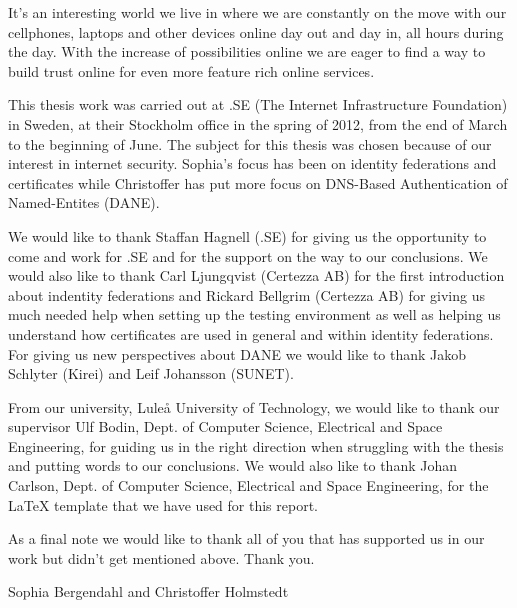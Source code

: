 It's an interesting world we live in where we are constantly on the move with our cellphones, laptops and other devices online day out and day in, all hours during the day.
With the increase of possibilities online we are eager to find a way to build trust online for even more feature rich online services.%

This thesis work was carried out at .SE (The Internet Infrastructure Foundation) in Sweden, at their Stockholm office in the spring of 2012, from the end of March to the beginning of June.
The subject for this thesis was chosen because of our interest in internet security.
Sophia's focus has been on identity federations and certificates while Christoffer has put more focus on DNS-Based Authentication of Named-Entites (DANE).

We would like to thank Staffan Hagnell (.SE) for giving us the opportunity to come and work for .SE and for the support on the way to our conclusions.
We would also like to thank Carl Ljungqvist (Certezza AB) for the first introduction about indentity federations and Rickard Bellgrim (Certezza AB) for giving us much needed help when setting up the testing environment as well as helping us understand how certificates are used in general and within identity federations.
For giving us new perspectives about DANE we would like to thank Jakob Schlyter (Kirei) and Leif Johansson (SUNET). 

From our university, Lule\r{a} University of Technology, we would like to thank our 
supervisor Ulf Bodin, Dept. of Computer Science, Electrical and Space Engineering, 
for guiding us in the right direction when struggling with the thesis and putting words to our conclusions.
We would also like to thank Johan Carlson, Dept. of Computer Science, Electrical and Space Engineering, 
for the LaTeX template that we have used for this report. 

As a final note we would like to thank all of you that has supported us in our work but didn't get mentioned above.
Thank you.




%



\vspace*{1.5cm}%
\hfill Sophia Bergendahl and Christoffer Holmstedt

